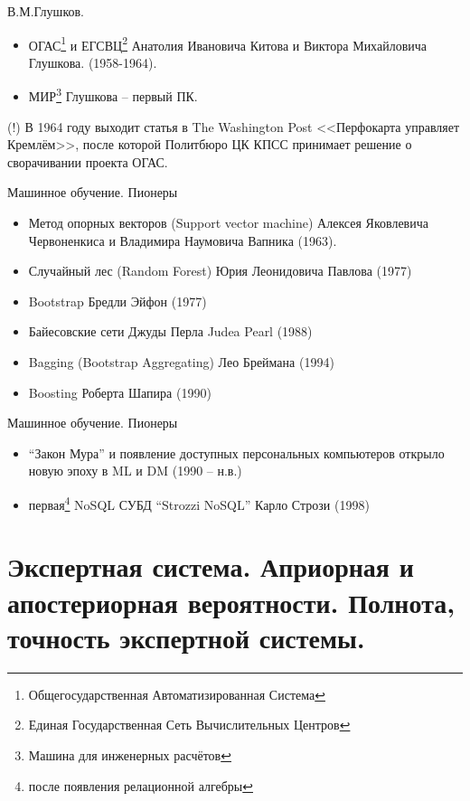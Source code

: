 \documentclass{beamer}
\begin{document}
   \begin{frame}{В.М.Глушков.}
	  \begin{itemize}
	  	\item ОГАС\footnote{Общегосударственная Автоматизированная Система}
	  	и ЕГСВЦ\footnote{Единая Государственная Сеть Вычислительных Центров}
	  	Анатолия Ивановича Китова
	  	и
	  	Виктора Михайловича Глушкова.
	  	(1958-1964).
	  	\item МИР\footnote{Машина для инженерных расчётов} Глушкова -- первый ПК.
	  \end{itemize}
     (!) В 1964 году выходит статья в The Washington Post <<Перфокарта управляет Кремлём>>,
     после которой Политбюро ЦК КПСС принимает решение о сворачивании проекта ОГАС. 
	\end{frame}
  
  \begin{frame}{Машинное обучение. Пионеры}
    \begin{itemize}
  	  \item Метод опорных векторов
  	  (Support vector machine)
  	  Алексея Яковлевича Червоненкиса
  	  и
  	  Владимира Наумовича Вапника (1963). 
  	  \item Случайный лес
  	  (Random Forest)
  	  Юрия Леонидовича Павлова (1977)
  	  \item Bootstrap 
  	  Бредли Эйфон (1977)
  	  \item Байесовские сети
  	  Джуды Перла
  	  Judea Pearl
  	  (1988)
  	  \item Bagging
  	  (Bootstrap Aggregating)
  	  Лео Бреймана
  	  (1994)
  	  \item Boosting
  	  Роберта Шапира 
  	  (1990)
    \end{itemize}
  \end{frame}

 
 
 \begin{frame}{Машинное обучение. Пионеры}
 \begin{itemize}
 	\item “Закон Мура” и появление
 	доступных
 	персональных компьютеров
 	открыло новую эпоху в ML и DM  
 	(1990 – н.в.)
 	\item первая\footnote{после появления релационной алгебры}
 	NoSQL СУБД
 	“Strozzi NoSQL”
 	Карло Стрози
 	(1998) 
 \end{itemize}
\end{frame}

  \section{Экспертная система. Априорная и апостериорная вероятности. Полнота, точность экспертной системы.}\label{section:expert_systems_recall_presision}
  
\end{document}
